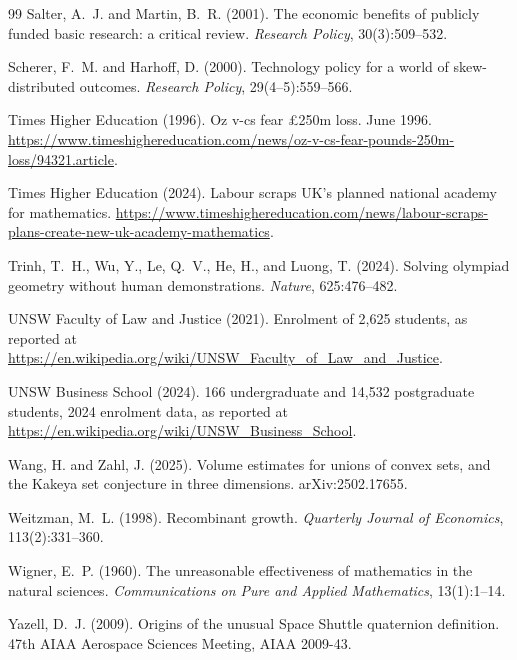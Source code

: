 \documentclass[11pt]{article}
\theoremstyle{definition}
\theoremstyle{remark}
\begin{document}
\begin{thebibliography}{99}
Salter, A.~J. and Martin, B.~R. (2001).
\newblock The economic benefits of publicly funded basic research: a critical review.
\newblock \emph{Research Policy}, 30(3):509--532.

Scherer, F.~M. and Harhoff, D. (2000).
\newblock Technology policy for a world of skew-distributed outcomes.
\newblock \emph{Research Policy}, 29(4--5):559--566.

Times Higher Education (1996).
\newblock Oz v-cs fear \pounds 250m loss.
 June 1996. \url{https://www.timeshighereducation.com/news/oz-v-cs-fear-pounds-250m-loss/94321.article}.

Times Higher Education (2024).
\newblock Labour scraps UK's planned national academy for mathematics.
\newblock \url{https://www.timeshighereducation.com/news/labour-scraps-plans-create-new-uk-academy-mathematics}.

Trinh, T.~H., Wu, Y., Le, Q.~V., He, H., and Luong, T. (2024).
\newblock Solving olympiad geometry without human demonstrations.
\newblock \emph{Nature}, 625:476--482.

UNSW Faculty of Law and Justice (2021).
\newblock Enrolment of 2{,}625 students, as reported at \url{https://en.wikipedia.org/wiki/UNSW_Faculty_of_Law_and_Justice}.

UNSW Business School (2024).
166 undergraduate and 14{,}532 postgraduate students, 2024 enrolment data, as reported at \url{https://en.wikipedia.org/wiki/UNSW_Business_School}.

Wang, H. and Zahl, J. (2025).
\newblock Volume estimates for unions of convex sets, and the Kakeya set conjecture in three dimensions.
\newblock arXiv:2502.17655.

Weitzman, M.~L. (1998).
\newblock Recombinant growth.
\newblock \emph{Quarterly Journal of Economics}, 113(2):331--360.

Wigner, E.~P. (1960).
\newblock The unreasonable effectiveness of mathematics in the natural sciences.
\newblock \emph{Communications on Pure and Applied Mathematics}, 13(1):1--14.

Yazell, D.~J. (2009).
\newblock Origins of the unusual Space Shuttle quaternion definition.
\newblock 47th AIAA Aerospace Sciences Meeting, AIAA 2009-43.

\end{thebibliography}
\end{document}
